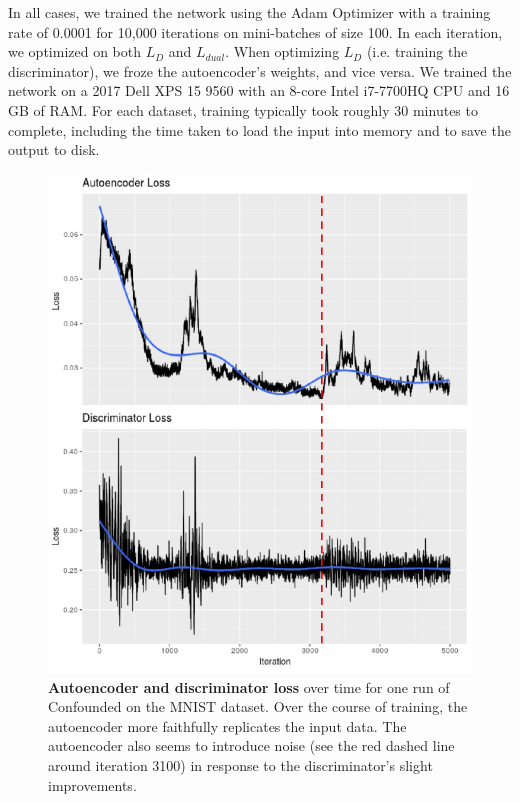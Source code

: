 \documentclass[11pt]{article}
\begin{document}
In all cases, we trained the network using the Adam Optimizer \citep{kingma_adam_2014} with a training rate of 0.0001 for 10,000 iterations on mini-batches of size 100.
In each iteration, we optimized on both $L_D$ and $L_{dual}$.
When optimizing $L_D$ (i.e. training the discriminator), we froze the autoencoder's weights, and vice versa.
We trained the network on a 2017 Dell XPS 15 9560 with an 8-core Intel i7-7700HQ CPU and 16 GB of RAM.
For each dataset, training typically took roughly 30 minutes to complete, including the time taken to load the input into memory and to save the output to disk.

\begin{figure}
	\centering
	\includegraphics[width=\columnwidth]{figures/final/training_loss.pdf}
	\caption[Autoencoder and discriminator loss]{\textbf{Autoencoder and discriminator loss} over time for one run of Confounded on the MNIST dataset.
	Over the course of training, the autoencoder more faithfully replicates the input data.
	The autoencoder also seems to introduce noise (see the red dashed line around iteration 3100) in response to the discriminator's slight improvements.}
	\label{fig:training_loss}
\end{figure}
\end{document}
